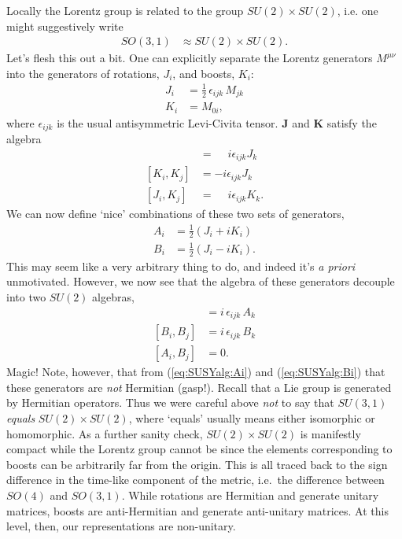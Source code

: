 \documentclass[12pt, oneside]{report}    %
\begin{document}
Locally the Lorentz group is related to the group $SU(2)\times SU(2)$, i.e. one might suggestively write
\begin{align}
    SO(3,1) &\approx SU(2)\times SU(2).
\end{align}
Let's flesh this out a bit. One can explicitly separate the Lorentz generators $M^{\mu\nu}$ into the generators of rotations, $J_i$, and boosts, $K_i$:
\begin{align}
    J_i &= \frac 12 \,\epsilon_{ijk}\,M_{jk}\label{eq:Poincar\'e:J}\\
    K_i &= M_{0i},\label{eq:Poincar\'e:K}
\end{align}
where $\epsilon_{ijk}$ is the usual antisymmetric Levi-Civita tensor. 
$\mathbf J$ and $\mathbf K$ satisfy the algebra
\begin{align}
    [J_i, J_j] &= \phantom+ i\epsilon_{ijk}J_k\label{eq:SUSYalg:JJ}\\
    [K_i, K_j] &= -i\epsilon_{ijk}J_k\label{eq:SUSYalg:KK}\\
    [J_i, K_j] &= \phantom+ i\epsilon_{ijk}K_k.\label{eq:SUSYalg:JK}
\end{align}
We can now define `nice' combinations of these two sets of generators,
\begin{align}
    A_i &= \frac 12 (J_i + iK_i)\label{eq:SUSYalg:Ai}\\
    B_i &= \frac 12 (J_i - iK_i)\label{eq:SUSYalg:Bi}.
\end{align}
This may seem like a very arbitrary thing to do, and indeed it's \textit{a priori} unmotivated. However, we now see that the algebra of these generators decouple into two $SU(2)$ algebras,
\begin{align}
    [A_i,A_j] &= i\,\epsilon_{ijk}\, A_k\\
    [B_i,B_j] &= i\,\epsilon_{ijk}\, B_k\\
    [A_i,B_j] &= 0.
\end{align}
Magic! %
Note, however, that from  (\ref{eq:SUSYalg:Ai}) and (\ref{eq:SUSYalg:Bi}) that these generators are \emph{not} Hermitian (gasp!). 
Recall that a Lie group is generated by Hermitian operators. Thus we were careful above \emph{not} to say that $SU(3,1)$ \textit{equals} $SU(2)\times SU(2)$, where `equals' usually means either isomorphic or homomorphic. As a further sanity check, $SU(2)\times SU(2)$ is manifestly compact while the Lorentz group cannot be since the elements corresponding to boosts can be arbitrarily far from the origin.
%
This is all traced back to the sign difference in the time-like component of the metric, i.e.\ the difference between $SO(4)$ and $SO(3,1)$. While rotations are Hermitian and generate unitary matrices, boosts are anti-Hermitian and generate anti-unitary matrices. At this level, then, our representations are non-unitary.
\end{document}
